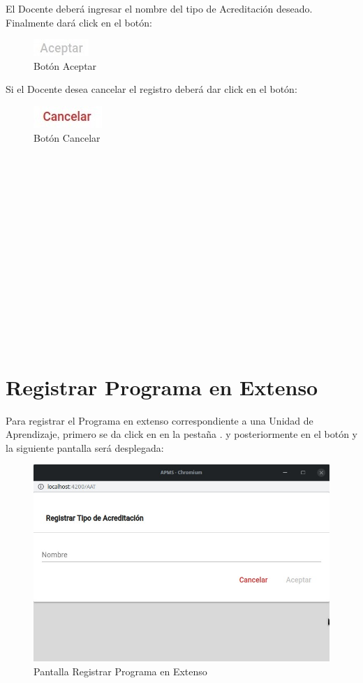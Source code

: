 \documentclass[10pt]{book}
\begin{document}
El Docente deberá ingresar el nombre del tipo de Acreditación deseado. Finalmente dará click en el botón: 

\begin{figure}[!hbtp]
    \centering
    \includegraphics[width=0.1\linewidth]{images/SP6/BotonAceptar.jpeg}
    \caption{Botón Aceptar} 
\end{figure}

Si el Docente desea cancelar el registro deberá dar click en el botón: 

\begin{figure}[!hbtp]
    \centering
    \includegraphics[width=0.1\linewidth]{images/SP6/BotonCancelar.jpeg}
    \caption{Botón Cancelar} 
\end{figure}
\pagebreak
\\\\\\\\\\\\\\\\\\\\\\\\\\\
\hypertarget{RegPE}{\section{Registrar Programa en Extenso}}

Para registrar el Programa en extenso correspondiente a una Unidad de Aprendizaje, primero se da click en en la pestaña . y posteriormente en el botón  y la siguiente pantalla será desplegada:

\begin{figure}[!h]
    \centering
    \hypertarget{RegPE}{\includegraphics[width=0.5\linewidth]{images/SP6/9.jpeg}}
    \caption{Pantalla Registrar Programa en Extenso}
\end{figure}
\end{document}
